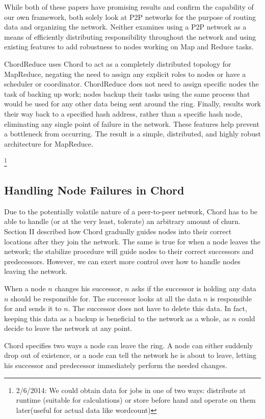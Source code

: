 \documentclass[10pt, conference, compsocconf]{IEEEtran}
\begin{document}
While both of these papers have promising results and confirm the capability of our own framework, both solely look at P2P networks for the purpose of routing data and organizing the network. Neither examines using a P2P network as a means of efficiently distributing responsibility throughout the network and using existing features to add robustness to nodes working on Map and Reduce tasks.  

ChordReduce uses Chord to act as a completely distributed topology for MapReduce, negating the need to assign any explicit roles to nodes or have a scheduler or coordinator.  ChordReduce does not need to assign specific nodes the task of backing up work; nodes backup their tasks using the same process that would be used for any other data being sent around the ring.  Finally, results work their way back to a specified hash address, rather than a specific hash node, eliminating any single point of failure in the network.  These features help prevent a bottleneck from occurring. The result is a simple, distributed, and highly robust architecture for MapReduce.


\footnote{2/6/2014:  We could obtain data for jobs in one of two ways:  distribute at runtime (suitable for calculations) or store before hand and operate on them later(useful for actual data like wordcount)}

\subsection{Handling Node Failures in Chord}
Due to the potentially volatile nature of a peer-to-peer network, Chord has to be able to handle (or at the very least, tolerate) an arbitrary amount of churn.  Section II described how Chord gradually guides nodes into their correct locations after they join the network.  The same is true for when a node leaves the network; the stabilize procedure will guide nodes to their correct successors and predecessors.  However, we can exert more control over how to handle nodes leaving the network.

When a node $n$ changes his successor, $n$ asks if the successor is holding any data $n$ should be responsible for.  The successor looks at all the data $n$ is responsible for and sends it to $n$.  The successor does not have to delete this data. In fact, keeping this data as a backup is beneficial to the network as a whole, as $n$ could decide to leave the network at any point. 

Chord specifies two ways a node can leave the ring.  A node can either suddenly drop out of existence, or a node can tell the network he is about to leave, letting his successor and predecessor immediately perform the needed changes.
\end{document}
